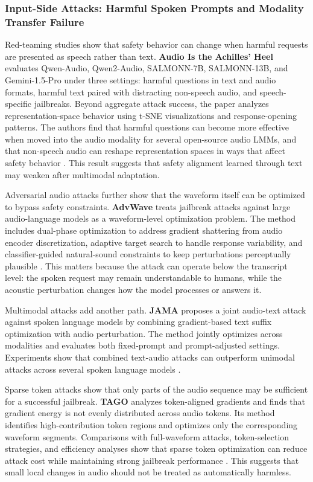 \subsubsection{Input-Side Attacks: Harmful Spoken Prompts and Modality Transfer Failure}

Red-teaming studies show that safety behavior can change when harmful requests are presented as speech rather than text. \textbf{Audio Is the Achilles' Heel} evaluates Qwen-Audio, Qwen2-Audio, SALMONN-7B, SALMONN-13B, and Gemini-1.5-Pro under three settings: harmful questions in text and audio formats, harmful text paired with distracting non-speech audio, and speech-specific jailbreaks. Beyond aggregate attack success, the paper analyzes representation-space behavior using t-SNE visualizations and response-opening patterns. The authors find that harmful questions can become more effective when moved into the audio modality for several open-source audio LMMs, and that non-speech audio can reshape representation spaces in ways that affect safety behavior \citep{yang2024audioachillesheelred}. This result suggests that safety alignment learned through text may weaken after multimodal adaptation.

Adversarial audio attacks further show that the waveform itself can be optimized to bypass safety constraints. \textbf{AdvWave} treats jailbreak attacks against large audio-language models as a waveform-level optimization problem. The method includes dual-phase optimization to address gradient shattering from audio encoder discretization, adaptive target search to handle response variability, and classifier-guided natural-sound constraints to keep perturbations perceptually plausible \citep{kang2024advwavestealthyadversarialjailbreak}. This matters because the attack can operate below the transcript level: the spoken request may remain understandable to humans, while the acoustic perturbation changes how the model processes or answers it.

Multimodal attacks add another path. \textbf{JAMA} proposes a joint audio-text attack against spoken language models by combining gradient-based text suffix optimization with audio perturbation. The method jointly optimizes across modalities and evaluates both fixed-prompt and prompt-adjusted settings. Experiments show that combined text-audio attacks can outperform unimodal attacks across several spoken language models \citep{krishnan2026optimizingmultimodaljailbreaksspoken}.

Sparse token attacks show that only parts of the audio sequence may be sufficient for a successful jailbreak. \textbf{TAGO} analyzes token-aligned gradients and finds that gradient energy is not evenly distributed across audio tokens. Its method identifies high-contribution token regions and optimizes only the corresponding waveform segments. Comparisons with full-waveform attacks, token-selection strategies, and efficiency analyses show that sparse token optimization can reduce attack cost while maintaining strong jailbreak performance \citep{fang2026sparsetokenssufficejailbreaking}. This suggests that small local changes in audio should not be treated as automatically harmless.

